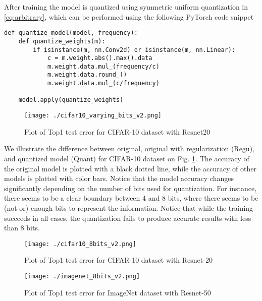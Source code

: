 \documentclass{article}
\newcommand{\squeeze}{\vspace{-2.5mm}}
\begin{document}
After training the model is quantized using symmetric uniform quantization in \eqref{eq:arbitrary}, which can be performed using the following PyTorch \cite{PyTorch} code snippet

\begin{verbatim}
def quantize_model(model, frequency):
    def quantize_weights(m):
        if isinstance(m, nn.Conv2d) or isinstance(m, nn.Linear):
            c = m.weight.abs().max().data
            m.weight.data.mul_(frequency/c)
            m.weight.data.round_()
            m.weight.data.mul_(c/frequency)

    model.apply(quantize_weights)
\end{verbatim}

\begin{figure}[h]
 \begin{center}
  \texttt{[image: ./cifar10\_varying\_bits\_v2.png]}
  \caption{Plot of Top1 test error for CIFAR-10 dataset with Resnet20}
  \label{fig:cifar10_resnet20_variable_amp}
  \squeeze 
 \end{center}
\end{figure}


We illustrate the difference between original, original with regularization (Regu), and quantized model (Quant) for CIFAR-10 dataset on Fig. \ref{fig:cifar10_resnet20_variable_amp}. The accuracy of the original model is plotted with a black dotted line, while the accuracy of other models is plotted with color bars. Notice that the model accuracy changes significantly depending on the number of bits used for quantization. For instance, there seems to be a clear boundary between 4 and 8 bits, where there seems to be (not or) enough bits to represent the information. Notice that while the training succeeds in all cases, the quantization fails to produce accurate results with less than 8 bits.

\begin{figure}[h]
 \begin{center}
  \texttt{[image: ./cifar10\_8bits\_v2.png]}
  \caption{Plot of Top1 test error for CIFAR-10 dataset with Resnet-20}
  \label{fig:cifar10_resnet20_fixed_amp}
  \squeeze 
 \end{center}
\end{figure}

\begin{figure}[h]
 \begin{center}
  \texttt{[image: ./imagenet\_8bits\_v2.png]}
  \caption{Plot of Top1 test error for ImageNet dataset with Resnet-50}
  \label{fig:imagenet_resnet50}
  \squeeze 
 \end{center}
\end{figure}
\end{document}
